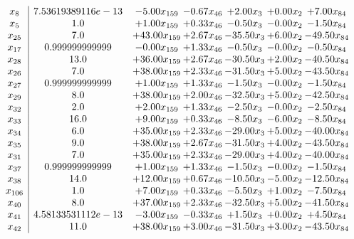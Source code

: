 \documentclass[8pt]{article}
\begin{document}
\[\begin{array}{c| c c@{\hskip 2pt} c@{\hskip 2pt} c@{\hskip 2pt} c@{\hskip 2pt} c@{\hskip 2pt} }
 x_{8}   &  7.53619389116e-13 & -5.00 x_{159} & -0.67 x_{46} & +  2.00 x_{3} & +  0.00 x_{2} & +  7.00 x_{84}\\
 x_{5}   &  1.0 & +  1.00 x_{159} & +  0.33 x_{46} & -0.50 x_{3} & -0.00 x_{2} & -1.50 x_{84}\\
 x_{25}   &  7.0 & + 43.00 x_{159} & +  2.67 x_{46} & -35.50 x_{3} & +  6.00 x_{2} & -49.50 x_{84}\\
 x_{17}   &  0.999999999999 & -0.00 x_{159} & +  1.33 x_{46} & -0.50 x_{3} & -0.00 x_{2} & -0.50 x_{84}\\
 x_{28}   &  13.0 & + 36.00 x_{159} & +  2.67 x_{46} & -30.50 x_{3} & +  2.00 x_{2} & -40.50 x_{84}\\
 x_{26}   &  7.0 & + 38.00 x_{159} & +  2.33 x_{46} & -31.50 x_{3} & +  5.00 x_{2} & -43.50 x_{84}\\
 x_{27}   &  0.999999999999 & +  1.00 x_{159} & +  1.33 x_{46} & -1.50 x_{3} & -0.00 x_{2} & -1.50 x_{84}\\
 x_{29}   &  8.0 & + 38.00 x_{159} & +  2.00 x_{46} & -32.50 x_{3} & +  5.00 x_{2} & -42.50 x_{84}\\
 x_{32}   &  2.0 & +  2.00 x_{159} & +  1.33 x_{46} & -2.50 x_{3} & -0.00 x_{2} & -2.50 x_{84}\\
 x_{33}   &  16.0 & +  9.00 x_{159} & +  0.33 x_{46} & -8.50 x_{3} & -6.00 x_{2} & -8.50 x_{84}\\
 x_{34}   &  6.0 & + 35.00 x_{159} & +  2.33 x_{46} & -29.00 x_{3} & +  5.00 x_{2} & -40.00 x_{84}\\
 x_{35}   &  9.0 & + 38.00 x_{159} & +  2.67 x_{46} & -31.50 x_{3} & +  4.00 x_{2} & -43.50 x_{84}\\
 x_{31}   &  7.0 & + 35.00 x_{159} & +  2.33 x_{46} & -29.00 x_{3} & +  4.00 x_{2} & -40.00 x_{84}\\
 x_{37}   &  0.999999999999 & +  1.00 x_{159} & +  1.33 x_{46} & -1.50 x_{3} & -0.00 x_{2} & -1.50 x_{84}\\
 x_{38}   &  14.0 & + 12.00 x_{159} & +  0.67 x_{46} & -10.50 x_{3} & -5.00 x_{2} & -12.50 x_{84}\\
 x_{106}   &  1.0 & +  7.00 x_{159} & +  0.33 x_{46} & -5.50 x_{3} & +  1.00 x_{2} & -7.50 x_{84}\\
 x_{40}   &  8.0 & + 37.00 x_{159} & +  2.33 x_{46} & -32.50 x_{3} & +  5.00 x_{2} & -41.50 x_{84}\\
 x_{41}   &  4.58133531112e-13 & -3.00 x_{159} & -0.33 x_{46} & +  1.50 x_{3} & +  0.00 x_{2} & +  4.50 x_{84}\\
 x_{42}   &  11.0 & + 38.00 x_{159} & +  3.00 x_{46} & -31.50 x_{3} & +  3.00 x_{2} & -43.50 x_{84}\\

\end{array}\]
\end{document}

